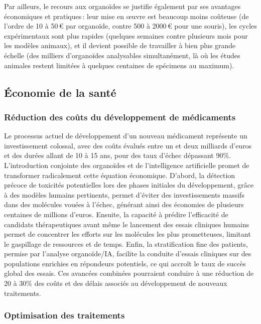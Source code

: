 Par ailleurs, le recours aux organoïdes se justifie également par ses avantages économiques et pratiques : leur mise en œuvre est beaucoup moins coûteuse (de l’ordre de 10 à 50 € par organoïde, contre 500 à 2000 € pour une souris), les cycles expérimentaux sont plus rapides (quelques semaines contre plusieurs mois pour les modèles animaux), et il devient possible de travailler à bien plus grande échelle (des milliers d’organoïdes analysables simultanément, là où les études animales restent limitées à quelques centaines de spécimens au maximum).

\subsection{Économie de la santé}

\subsubsection{Réduction des coûts du développement de médicaments}

Le processus actuel de développement d’un nouveau médicament représente un investissement colossal, avec des coûts évalués entre un et deux milliards d'euros et des durées allant de 10 à 15 ans, pour des taux d'échec dépassant 90\%. L’introduction conjointe des organoïdes et de l’intelligence artificielle promet de transformer radicalement cette équation économique. D’abord, la détection précoce de toxicités potentielles lors des phases initiales du développement, grâce à des modèles humains pertinents, permet d’éviter des investissements massifs dans des molécules vouées à l’échec, générant ainsi des économies de plusieurs centaines de millions d’euros. Ensuite, la capacité à prédire l’efficacité de candidats thérapeutiques avant même le lancement des essais cliniques humains permet de concentrer les efforts sur les molécules les plus prometteuses, limitant le gaspillage de ressources et de temps. Enfin, la stratification fine des patients, permise par l’analyse organoïde/IA, facilite la conduite d’essais cliniques sur des populations enrichies en répondeurs potentiels, ce qui accroît le taux de succès global des essais. Ces avancées combinées pourraient conduire à une réduction de 20 à 30\% des coûts et des délais associés au développement de nouveaux traitements.

\subsubsection{Optimisation des traitements}

